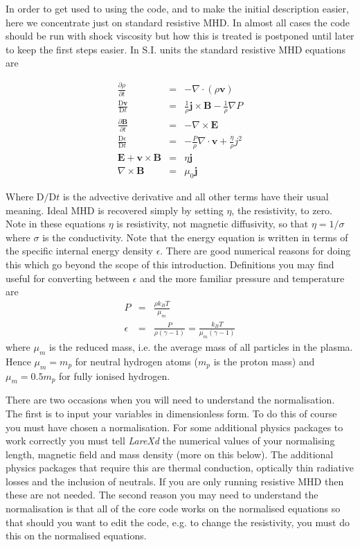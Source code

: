 \documentclass[11pt]{article}
\begin{document}
In order to get used to using the code, and to make the initial description easier, here we concentrate 
just on standard resistive MHD. In almost all cases the code should be run with shock viscosity
but how this is treated is postponed until later to keep the first steps easier. In S.I. units the 
standard resistive MHD equations are

\begin{eqnarray}
\frac{\partial \rho}{\partial t}&=&- \nabla\cdot(\rho \mathbf{v})\\
\frac{\mathrm{D}\mathbf{v}}{\mathrm{D}t}&=&\frac{1}{\rho}\mathbf{j}\times\mathbf{B}
-\frac{1}{\rho}\nabla P\\
\frac{\partial \mathbf{B}}{\partial t}&=&-\nabla\times\mathbf{E} \label{faraday}\\
\frac{\mathrm{D}\epsilon}{\mathrm{D}t}&=&-\frac{P}{\rho}\nabla\cdot\mathbf{v}+\frac
{\eta}{\rho}j^{2}\\
\mathbf{E}+\mathbf{v}\times\mathbf{B}&=&\eta \mathbf{j} \label{ohm}\\
\nabla\times\mathbf{B}&=&\mu_0 \mathbf{j}
\end{eqnarray}

Where $\mathrm{D}/\mathrm{D}t$ is the advective derivative and all other terms have their usual 
meaning. Ideal MHD is recovered simply by setting $\eta$, the resistivity, to zero. Note in these 
equations $\eta$ is resistivity, not magnetic diffusivity, so that $\eta=1/\sigma$ where $\sigma$ is 
the conductivity. Note that the energy equation is written in terms of the specific internal energy 
density $\epsilon$. There are good numerical reasons for doing this which go beyond the scope of this 
introduction. Definitions you may find useful for converting between $\epsilon$ and the more familiar 
pressure and temperature are
\begin{eqnarray*}
P&=&\frac{\rho k_{B}T}{\mu_m}\\
\epsilon&=&\frac{P}{\rho(\gamma-1)}=\frac{k_B T}{\mu_m (\gamma-1)}
\end{eqnarray*}
where $\mu_m$ is the reduced mass, i.e. the average mass of all particles in the plasma. 
Hence $\mu_m=m_p$ for neutral hydrogen atoms ($m_p$ is the proton mass) and $\mu_m=0.5 m_p$ for fully 
ionised hydrogen.

There are two occasions when you will need to understand the normalisation. The first is to input your 
variables in dimensionless form. To do this of course you must have chosen a normalisation. For some 
additional physics packages to work correctly you must tell {\it LareXd} the numerical values of your 
normalising length, magnetic field and mass density (more on this below). The additional physics packages 
that require this are thermal conduction, optically thin radiative losses and the inclusion of neutrals. 
If you are only running resistive MHD then these are not needed. The second reason you may need to 
understand the normalisation is that all of the core code works on the normalised equations so that 
should you want to edit the code, e.g. to change the resistivity, you must do this on the normalised equations.
\end{document}
